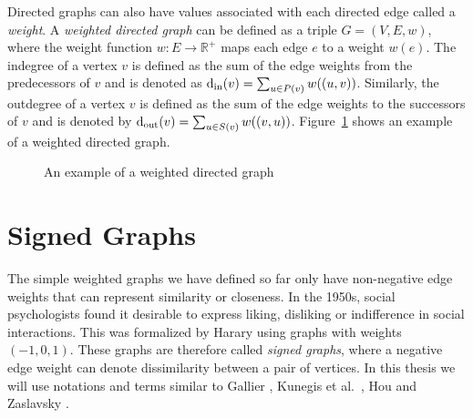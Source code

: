Directed graphs can also have values associated with each directed edge called a \textit{weight}. A \textit{weighted directed graph} can be defined as a triple $G=(V,E,w)$, where the weight function $w:E \rightarrow \mathbb{R}^{+}$ maps each edge $e$ to a weight $w(e)$. The indegree of a vertex $v$ is defined as the sum of the edge weights from the predecessors of $v$ and is denoted as $\operatorname*{d_{\text{in}}}(v) = \sum_{u \in P(v)} w((u,v))$. Similarly, the outdegree of a vertex $v$ is defined as the sum of the edge weights to the successors of $v$ and is denoted by $\operatorname*{d_{\text{out}}}(v) = \sum_{u \in S(v)}w((v,u))$.
Figure~\ref{fig:weighted-directed} shows an example of a weighted directed graph.

\begin{figure}[!ht]
    \centering
    
    \caption{An example of a weighted directed graph}
    \label{fig:weighted-directed}
\end{figure}

\section{Signed Graphs}
\label{sec:signed-graphs}
The simple weighted graphs we have defined so far only have non-negative edge weights that can represent similarity or closeness. In the 1950s, social psychologists found it desirable to express liking, disliking or indifference in social interactions. This was formalized by Harary \cite{harary1953on} using graphs with weights $(-1,0,1)$. These graphs are therefore called \textit{signed graphs}, where a negative edge weight can denote dissimilarity between a pair of vertices. In this thesis we will use notations and terms similar to Gallier \cite{gallier2016spectral}, Kunegis et al.\ \cite{kunegis2010spectral}, Hou \cite{hou2005bounds} and Zaslavsky \cite{zaslavsky1982signed}.

